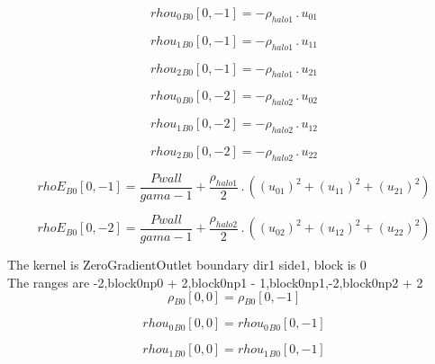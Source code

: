\documentclass{article}
\begin{document}
\begin{dmath}{rhou_{0}{_{B0}}}[{0,-1}] = - \rho_{halo 1} \,.\, u_{01}\end{dmath}

\begin{dmath}{rhou_{1}{_{B0}}}[{0,-1}] = - \rho_{halo 1} \,.\, u_{11}\end{dmath}

\begin{dmath}{rhou_{2}{_{B0}}}[{0,-1}] = - \rho_{halo 1} \,.\, u_{21}\end{dmath}

\begin{dmath}{rhou_{0}{_{B0}}}[{0,-2}] = - \rho_{halo 2} \,.\, u_{02}\end{dmath}

\begin{dmath}{rhou_{1}{_{B0}}}[{0,-2}] = - \rho_{halo 2} \,.\, u_{12}\end{dmath}

\begin{dmath}{rhou_{2}{_{B0}}}[{0,-2}] = - \rho_{halo 2} \,.\, u_{22}\end{dmath}

\begin{dmath}{rhoE{_{B0}}}[{0,-1}] = \frac{Pwall}{gama - 1} + \frac{\rho_{halo 1}}{2} \,.\, \left(\left(u_{01} \right)^{2} + \left(u_{11} \right)^{2} + \left(u_{21} \right)^{2}\right)\end{dmath}

\begin{dmath}{rhoE{_{B0}}}[{0,-2}] = \frac{Pwall}{gama - 1} + \frac{\rho_{halo 2}}{2} \,.\, \left(\left(u_{02} \right)^{2} + \left(u_{12} \right)^{2} + \left(u_{22} \right)^{2}\right)\end{dmath}

\noindent The kernel is ZeroGradientOutlet boundary dir1 side1, block is 0\\\noindent The ranges are -2,block0np0 + 2,block0np1 - 1,block0np1,-2,block0np2 + 2\\\begin{dmath}{\rho{_{B0}}}[{0,0}] = {\rho{_{B0}}}[{0,-1}]\end{dmath}

\begin{dmath}{rhou_{0}{_{B0}}}[{0,0}] = {rhou_{0}{_{B0}}}[{0,-1}]\end{dmath}

\begin{dmath}{rhou_{1}{_{B0}}}[{0,0}] = {rhou_{1}{_{B0}}}[{0,-1}]\end{dmath}
\end{document}
